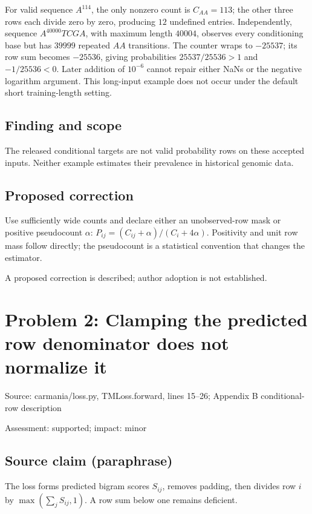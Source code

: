\documentclass[11pt]{article}
\begin{document}
For valid sequence \(A^{114}\), the only nonzero count is \(C_{AA}=113\); the other three rows each divide zero by zero, producing \(12\) undefined entries. Independently, sequence \(A^{40000}TCGA\), with maximum length \(40004\), observes every conditioning base but has \(39999\) repeated \(AA\) transitions. The counter wraps to \(-25537\); its row sum becomes \(-25536\), giving probabilities \(25537/25536>1\) and \(-1/25536<0\). Later addition of \(10^{-6}\) cannot repair either NaNs or the negative logarithm argument. This long-input example does not occur under the default short training-length setting.

\subsection*{Finding and scope}

The released conditional targets are not valid probability rows on these accepted inputs. Neither example estimates their prevalence in historical genomic data.

\subsection*{Proposed correction}

Use sufficiently wide counts and declare either an unobserved-row mask or positive pseudocount \(\alpha\): \(P_{ij}=(C_{ij}+\alpha)/(C_i+4\alpha)\). Positivity and unit row mass follow directly; the pseudocount is a statistical convention that changes the estimator.

A proposed correction is described; author adoption is not established.

\section*{Problem 2: Clamping the predicted row denominator does not normalize it}

Source: carmania/loss.py, TMLoss.forward, lines 15–26; Appendix B conditional-row description

Assessment: supported; impact: minor

\subsection*{Source claim (paraphrase)}

The loss forms predicted bigram scores \(S_{ij}\), removes padding, then divides row \(i\) by \(\max(\sum_jS_{ij},1)\). A row sum below one remains deficient.
\end{document}
